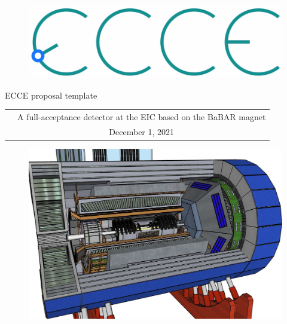 \renewcommand*\familydefault{\sfdefault}
{\sffamily
\vfill
\vspace{4cm}
\begin{figure}[H]
  \begin{center}
  \includegraphics[width=0.3\linewidth]{figs/ecce-logo.png}
\end{center}
\end{figure}

\begin{center}
  \large
  {\LARGE{ECCE proposal template}}

  \begin{tabular}{cc}
&A full-acceptance detector at the EIC based on the BaBAR magnet \\
&December 1, 2021 \\
  \end{tabular}
  \end{center}

\vspace{1cm}

\begin{figure}[H]
  \begin{center}
    \includegraphics[width=0.7\linewidth]{figs/ECCE.png}
  \end{center}
\end{figure}
}


\vfill
\renewcommand*\familydefault{\rmdefault}
